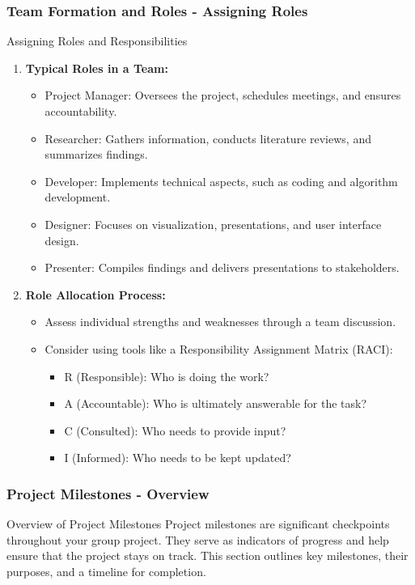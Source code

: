 \documentclass{beamer}
\begin{document}
\begin{frame}[fragile]
    \frametitle{Team Formation and Roles - Assigning Roles}
    \begin{block}{Assigning Roles and Responsibilities}
        \begin{enumerate}
            \item \textbf{Typical Roles in a Team:}
            \begin{itemize}
                \item Project Manager: Oversees the project, schedules meetings, and ensures accountability.
                \item Researcher: Gathers information, conducts literature reviews, and summarizes findings.
                \item Developer: Implements technical aspects, such as coding and algorithm development.
                \item Designer: Focuses on visualization, presentations, and user interface design.
                \item Presenter: Compiles findings and delivers presentations to stakeholders.
            \end{itemize}

            \item \textbf{Role Allocation Process:}
            \begin{itemize}
                \item Assess individual strengths and weaknesses through a team discussion.
                \item Consider using tools like a Responsibility Assignment Matrix (RACI):
                \begin{itemize}
                    \item R (Responsible): Who is doing the work?
                    \item A (Accountable): Who is ultimately answerable for the task?
                    \item C (Consulted): Who needs to provide input?
                    \item I (Informed): Who needs to be kept updated?
                \end{itemize}
            \end{itemize}
        \end{enumerate}
    \end{block}
\end{frame}

\begin{frame}[fragile]
    \frametitle{Project Milestones - Overview}
    \begin{block}{Overview of Project Milestones}
        Project milestones are significant checkpoints throughout your group project. They serve as indicators of progress and help ensure that the project stays on track. This section outlines key milestones, their purposes, and a timeline for completion.
    \end{block}
\end{frame}
\end{document}
